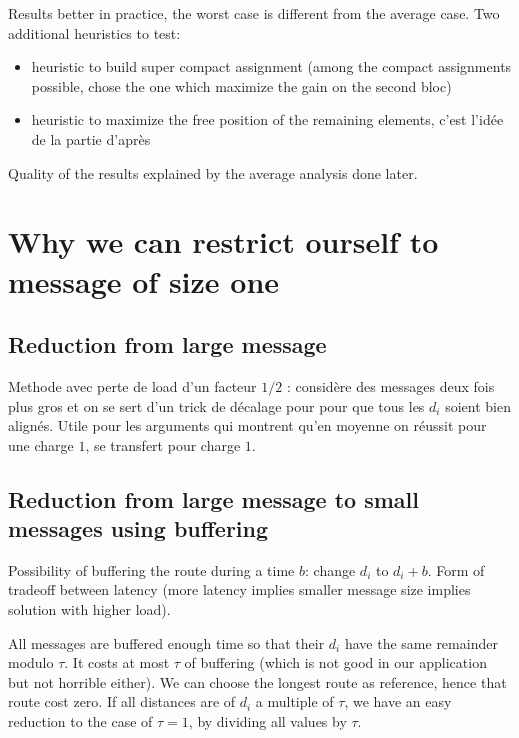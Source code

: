 \documentclass[10pt, conference, letterpaper]{IEEEtran}
\begin{document}
Results better in practice, the worst case is different from the 
average case.
Two additional heuristics to test:
\begin{itemize}
	\item  heuristic to build super compact assignment (among the compact assignments
possible, chose the one which maximize the gain on the second bloc)
	\item heuristic to maximize the free position of the remaining elements, c'est l'idée
	de la partie d'après
\end{itemize}

Quality of the results explained by the average analysis done later.
 

\section{Why we can restrict ourself to message of size one}

\subsection{Reduction from large message}

Methode avec perte de load d'un facteur $1/2$ : considère 
des messages deux fois plus gros et on se sert d'un trick de décalage pour 
pour que tous les $d_i$ soient bien alignés.  
Utile pour les arguments qui montrent qu'en moyenne on
réussit pour une charge $1$, se transfert pour charge $1$.


\subsection{Reduction from large message to small messages using buffering}

Possibility of buffering the route during a time $b$: change $d_i$ to $d_i + b$. 
Form of tradeoff between latency (more latency implies smaller message size implies
solution with higher load).


All messages are buffered enough time so that their $d_i$ have the same
remainder modulo $\tau$. It costs at most $\tau$ of buffering (which is not
good in our application but not horrible either). We can choose the longest 
route as reference, hence that route cost zero. 
If all distances are of $d_i$ a multiple of $\tau$, we have an
easy reduction to the case of $\tau = 1$, by dividing all values by $\tau$.
\end{document}
